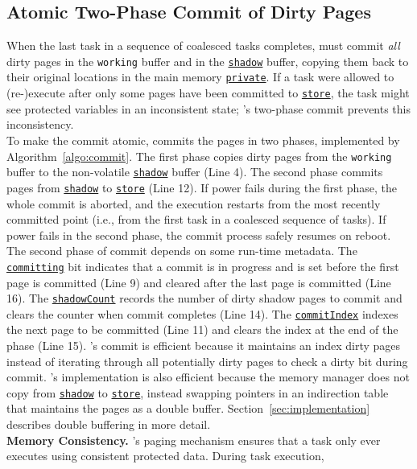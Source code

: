 \subsection{Atomic Two-Phase Commit of Dirty Pages}
%
When the last task in a sequence of coalesced tasks completes, \sys must commit
\emph{all} dirty pages in the \texttt{working} buffer and in the
\texttt{\underline{shadow}} buffer, copying them back to their original
locations in the main memory \texttt{\underline{private}}. If a task were allowed
to (re-)execute after only some pages have been committed to
\texttt{\underline{store}}, the task might see protected variables in an
inconsistent state; \sys's two-phase commit prevents this inconsistency. \\
%
To make the commit atomic, \sys commits the pages in two phases, implemented by
Algorithm~\ref{algo:commit}.
%
The first phase copies dirty pages from the \texttt{working} buffer to the
non-volatile \texttt{\underline{shadow}} buffer (Line 4). The second phase
commits pages from \texttt{\underline{shadow}} to \texttt{\underline{store}}
(Line 12).  If power fails during the first phase, the whole commit is aborted,
and the execution restarts from the most recently committed point (i.e., from
the first task in a coalesced sequence of tasks). If power fails in the second
phase, the commit process safely resumes on reboot.  The second phase of commit
depends on some run-time metadata. The \texttt{\underline{committing}} bit
indicates that a commit is in progress and is set before the first page is
committed (Line 9) and cleared after the last page is committed (Line 16).  The
\texttt{\underline{shadowCount}} records the number of dirty shadow pages to
commit and \sys clears the counter when commit completes (Line 14).  The
\texttt{\underline{commitIndex}} indexes the next page to be committed (Line
11) and \sys clears the index at the end of the phase (Line 15).
%
\sys's commit is efficient because it maintains an index dirty pages instead of
iterating through all potentially dirty pages to check a dirty bit during
commit.
%
\sys's implementation is also efficient because the memory manager does not
copy from \texttt{\underline{shadow}} to \texttt{\underline{store}}, instead
swapping pointers in an indirection table that maintains the pages as a double
buffer.  Section~\ref{sec:implementation} describes double buffering in more
detail. \\
%
\textbf{Memory Consistency.} \sys's paging mechanism ensures that a task only
ever executes using consistent protected data. During task execution,
